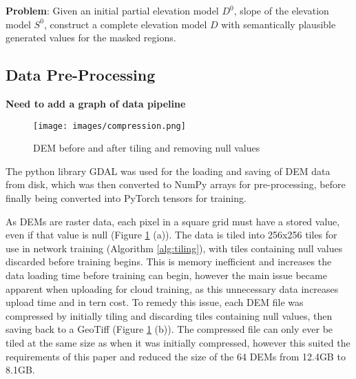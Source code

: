 \documentclass[twocolumn]{article}
\begin{document}
\textbf{Problem}: Given an initial partial elevation model \(D^0\), slope of the elevation model \(S^0\), construct a complete elevation model \(D\) with semantically plausible generated values for the masked regions.


\subsection{Data Pre-Processing}
\label{sec:orgd26ba1c}

\textbf{Need to add a graph of data pipeline}

\begin{figure}[htbp]
\centering
\texttt{[image: images/compression.png]}
\caption{\label{fig:compression}DEM before and after tiling and removing null values}
\end{figure}

The python library GDAL\autocite{rouaultevenGDAL2023} was used for the loading and saving of DEM data from disk, which was then converted to NumPy\autocite{NumPy} arrays for pre-processing, before finally being converted into PyTorch\autocite{PyTorch} tensors for training.

As DEMs are raster data, each pixel in a square grid must have a stored value, even if that value is null (Figure \ref{fig:compression} (a)).
The data is tiled into 256x256 tiles for use in network training (Algorithm \ref{alg:tiling}), with tiles containing null values discarded before training begins.
This is memory inefficient and increases the data loading time before training can begin, however the main issue became apparent when uploading for cloud training, as this unnecessary data increases upload time and in tern cost.
To remedy this issue, each DEM file was compressed by initially tiling and discarding tiles containing null values, then saving back to a GeoTiff (Figure \ref{fig:compression} (b)).
The compressed file can only ever be tiled at the same size as when it was initially compressed, however this suited the requirements of this paper and reduced the size of the 64 DEMs from 12.4GB to 8.1GB.
\end{document}
